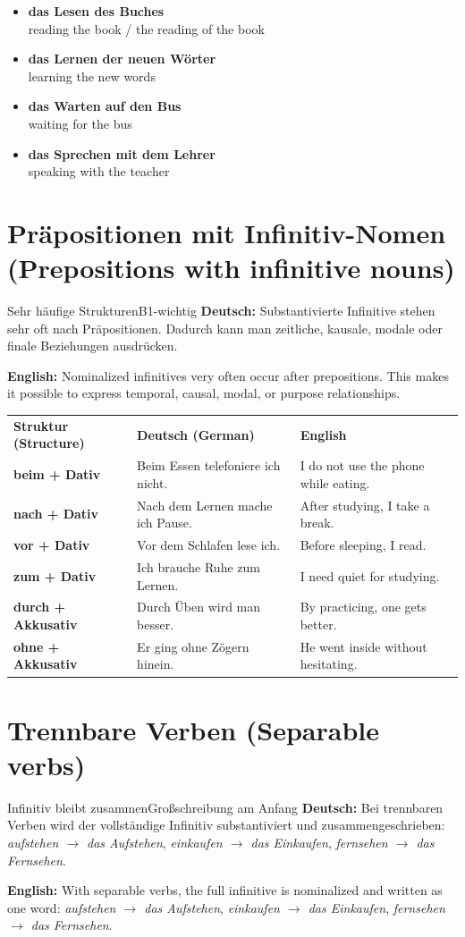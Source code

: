 \documentclass[a4paper,11pt]{article}
\newcommand{\GermanText}[1]{\textbf{Deutsch: }#1\par}
\newcommand{\EnglishText}[1]{{\small\color{SoftGray}\textbf{English: }#1\par}}
\newcommand{\ExampleItem}[2]{\item \textbf{#1}\\{\small\color{SoftGray}#2}}
\begin{document}
\begin{exbox}
\begin{itemize}
\ExampleItem{das Lesen des Buches}{reading the book / the reading of the book}
\ExampleItem{das Lernen der neuen Wörter}{learning the new words}
\ExampleItem{das Warten auf den Bus}{waiting for the bus}
\ExampleItem{das Sprechen mit dem Lehrer}{speaking with the teacher}
\end{itemize}
\end{exbox}

\section{Präpositionen mit Infinitiv-Nomen \textnormal{(Prepositions with infinitive nouns)}}
\begin{grammarentry}{Sehr häufige Strukturen}{B1-wichtig}
\GermanText{Substantivierte Infinitive stehen sehr oft nach Präpositionen. Dadurch kann man zeitliche, kausale, modale oder finale Beziehungen ausdrücken.}
\EnglishText{Nominalized infinitives very often occur after prepositions. This makes it possible to express temporal, causal, modal, or purpose relationships.}
\end{grammarentry}

\begin{longtable}{>{\bfseries}p{3.0cm}|p{5.2cm}|p{5.1cm}}
\rowcolor{HeaderBlueDark}
\color{white}\textbf{Struktur (Structure)} & \color{white}\textbf{Deutsch (German)} & \color{white}\textbf{English} \\
beim + Dativ & Beim Essen telefoniere ich nicht. & I do not use the phone while eating. \\
nach + Dativ & Nach dem Lernen mache ich Pause. & After studying, I take a break. \\
vor + Dativ & Vor dem Schlafen lese ich. & Before sleeping, I read. \\
zum + Dativ & Ich brauche Ruhe zum Lernen. & I need quiet for studying. \\
durch + Akkusativ & Durch Üben wird man besser. & By practicing, one gets better. \\
ohne + Akkusativ & Er ging ohne Zögern hinein. & He went inside without hesitating. \\
\end{longtable}

\section{Trennbare Verben \textnormal{(Separable verbs)}}
\begin{grammarentry}{Infinitiv bleibt zusammen}{Großschreibung am Anfang}
\GermanText{Bei trennbaren Verben wird der vollständige Infinitiv substantiviert und zusammengeschrieben: \textit{aufstehen $\rightarrow$ das Aufstehen}, \textit{einkaufen $\rightarrow$ das Einkaufen}, \textit{fernsehen $\rightarrow$ das Fernsehen}.}
\EnglishText{With separable verbs, the full infinitive is nominalized and written as one word: \textit{aufstehen $\rightarrow$ das Aufstehen}, \textit{einkaufen $\rightarrow$ das Einkaufen}, \textit{fernsehen $\rightarrow$ das Fernsehen}.}
\end{grammarentry}
\end{document}

